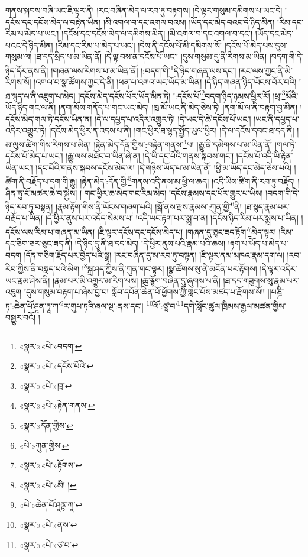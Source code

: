 གནས་སྐབས་བཞི་ཡང་ཇི་ལྟར་ནི། །རང་བཞིན་མེད་ལ་རབ་ཏུ་བརྟགས། །དེ་ལྟར་གསུམ་དམིགས་པ་ཡང་དེ། །དངོས་དང་དངོས་མེད་ལ་བརྟེན་ཡིན། །མི་འགལ་བ་དང་འགལ་བའམ། །ཡོད་དང་མེད་བའང་དེ་ཉིད་མིན། །རིམ་དང་རིམ་པ་མེད་པ་ཡང་། །དངོས་དང་དངོས་མེད་ལ་དམིགས་མིན། །མི་འགལ་བ་དང་འགལ་བ་དང་། །ཡོད་དང་མེད་པའང་དེ་ཉིད་མིན། །རིམ་དང་རིམ་པ་མེད་པ་ཡང་། །དེས་ནི་དངོས་པོ་མི་དམིགས་སོ། །དངོས་པོ་མེད་པས་དུས་གསུམ་ལ། །ཐ་དད་སྲིད་པ་མ་ཡིན་ནོ། །དེ་ལྟ་བས་ན་དངོས་པོ་ཡང་། །དུས་གསུམ་དུ་ནི་རིགས་མ་ཡིན། །བདག་གི་དེ་ཉིད་དོར་ནས་ནི། །གཞན་ལས་རིགས་པ་མ་ཡིན་ནོ། །:བདག་གི་\footnote{«སྣར་»«པེ་»བདག་}དེ་ཉིད་གཞན་ལས་དང་། །རང་ལས་ཀྱང་ནི་མི་རིགས་སོ། །འགལ་བ་སྣ་ཚོགས་ཀྱང་དེ་ནི། །ཕན་པ་འགའ་ཡང་ཡོད་མ་ཡིན། །དེ་ཉིད་གཞན་ཉིད་ཡོངས་བོར་བའི། །ཐ་སྙད་ལ་ནི་འཇུག་པ་མེད། །དངོས་མེད་དངོས་པོར་ཡོད་མིན་ཏེ། །:དངོས་པོ་\footnote{«སྣར་»«པེ་»དངོས་པོའི་}བདག་ཉིད་ཉམས་ཕྱིར་རོ། །ཕྲ་\footnote{«སྣར་»«པེ་»ཁྲ་}མོའི་ཡོད་ཉིད་གང་ལ་ནི། །ནག་མོས་གནོད་པ་གང་ཡང་མེད། །ཁྲ་མོ་ཡང་ནི་མེད་ཅེས་ཏེ། །ནག་མོ་ལ་ནི་བརྟག་བྱ་མིན། །དངོས་མེད་གལ་ཏེ་དངོས་ཡིན་ན། །དེ་ལ་དཔྱད་པ་འདིར་འགྱུར་ཏེ། །དེ་ཡང་དེ་ཚེ་དངོས་པོ་ཡང་། །ཡང་ནི་དཔྱད་པ་འདིར་འགྱུར་ཏེ། །དངོས་མེད་ཕྱིར་ན་འདས་པ་ནི། །གང་ཕྱིར་ཐ་སྙད་སྤྱོད་ཡུལ་ཕྱིར། །དེ་ལ་དངོས་དབང་ཐ་དད་ནི། །མ་ལུས་ཚིག་གིས་རིགས་པ་མིན། །རྟེན་མེད་དོན་གྱིས་:བརྟེན་གནས་\footnote{«སྣར་»«པེ་»རྟེན་གནས་}པ། །རྒྱུ་ནི་དམིགས་པ་མ་ཡིན་ནོ། །གལ་ཏེ་དངོས་པོ་མེད་པ་ཡང་། །རྒྱུ་ལས་མཐོང་བ་ཡིན་ཞེ་ན། །དེ་ཡི་དང་པོའི་གནས་སྐབས་གང་། །དངོས་པོ་འདི་ཡི་རྟེན་ཡིན་ཡང་། །དང་པོའི་གནས་སྐབས་དངོས་མེད་ལ། །དེ་གཉིས་ཡོད་པ་མ་ཡིན་ནོ། །ཕྱི་མ་ཡོད་དང་མེད་ཅེས་པའི། །ཚིག་ནི་བརྗོད་པ་དག་གི་རྒྱུ། །རྟེན་མེད་:དོན་གྱི་\footnote{«སྣར་»དོན་གྱིས་}གནས་འདི་ནས་མ་ཕྱི་ལ་ཆད། །འདི་ཡིས་ཚིག་ནི་རབ་ཏུ་བརྗོད། །ཤིན་ཏུ་ངོ་མཚར་ཆེ་བ་སྐྱེས། །
གང་ཕྱིར་ཆ་མེད་གང་རིམ་མེད། །དངོས་རྣམས་དང་པོར་གྱུར་པ་ཡིས། །བདག་གི་དེ་ཉིད་རབ་ཏུ་བསྟན། །རྣམ་རྟོག་གིས་ནི་ཡོངས་གཞག་པའི། །སྒོ་ནས་རྫས་རྣམས་:ཀུན་གྱི་\footnote{«པེ་»ཀུན་གྱིས་}ནི། །ཐ་སྙད་རྣམ་པར་བརྗོད་པ་ཡིན། །དེ་ཕྱིར་ནུས་པར་འདོད་སེམས་པ། །འདི་ཡང་རྟག་པར་སྨྲ་བ་ན། །དངོས་ཉིད་རིམ་པར་སྨྲས་པ་ཡིན། །དངོས་ལས་རིམ་པ་གཞན་མ་ཡིན། །ཇི་ལྟར་དངོས་དང་དངོས་མེད་པ། །གཞན་དུ་ཅུང་ཟད་རྟོག་\footnote{«སྣར་»«པེ་»རྟོགས་}མེད་ལྟར། །རིམ་དང་ཅིག་ཅར་ཅུང་ཟད་ནི། །དེ་ཉིད་དུ་ནི་ཐ་དད་མེད། །དེ་ཕྱིར་ནུས་པའི་རྣམ་པའི་ཆས། །རྟག་པ་ཡོད་པ་མེད་པ་བདག །དོན་གཅིག་རྗོད་པར་བྱེད་པའི་སྒྲ། །རང་བཞིན་དུ་མ་རབ་ཏུ་བསྟན། །ཇི་ལྟར་ནམ་མཁའ་རྣམ་དག་ལ། །རབ་རིབ་ཀྱིས་ནི་བསླད་པའི་མིག །\footnote{«སྣར་»«པེ་»མི། །}སྐྲ་ཤད་ཀྱིས་ནི་ཀུན་གང་ལྟར། །སྣ་ཚོགས་སུ་ནི་མངོན་པར་རྟོགས། །དེ་ལྟར་འདིར་ཡང་རྣམ་ཤེས་ནི། །རྣམ་པར་མི་འགྱུར་མ་རིག་པས། །ཆུ་རྙོག་བཞིན་དུ་ཞུགས་པ་ནི། །ཐ་དད་གཟུགས་སུ་རྣམ་པར་འཇུག །དུས་གསུམ་བརྟག་པ་ཞེས་བྱ་བ། སློབ་དཔོན་ཆེན་པོ་ཕྱོགས་ཀྱི་གླང་པོས་མཛད་པ་རྫོགས་སོ།། །།པཎྜི་ཏ་:ཆེན་པོ་ཤཱན་ཏཱ་ཀ་\footnote{«པེ་»ཆེན་པོ་ཤཱནྟ་ཀཱ་}ར་གུཔ་ཏའི་ཞལ་སྔ་:ནས་དང་། \footnote{«སྣར་»«པེ་»ནས་}ལོ་:ཙཱ་བ་\footnote{«སྣར་»«པེ་»ཙ་བ་}དགེ་སློང་ཚུལ་ཁྲིམས་རྒྱལ་མཚན་གྱིས་བསྒྱུར་བའོ། ། 
